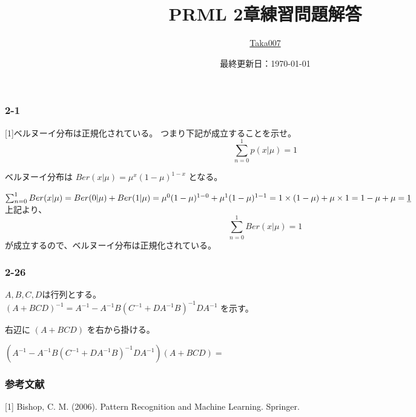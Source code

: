\documentclass{ltjsarticle}
\title{PRML 2章練習問題解答}
\author{\href{https://github.com/Taka0007}{Taka007}}
\date{最終更新日：\today}
\begin{document}
\maketitle

\subsubsection*{2-1}

[1]ベルヌーイ分布は正規化されている。
つまり下記が成立することを示せ。
$$
\sum_{n=0}^1 p(x| \mu ) = 1
$$

ベルヌーイ分布は
$
Ber(x| \mu) = \mu^x (1-\mu)^{1-x}
$
となる。

$
\sum_{n=0}^1 Ber(x| \mu)
= Ber(0| \mu) + Ber(1| \mu)
= \mu^0 (1-\mu)^{1-0} + \mu^1 (1-\mu)^{1-1}
= 1 \times (1-\mu) + \mu \times 1 \\
= 1-\mu + \mu
= \underline{1}
$
\\

上記より、
$$
\sum_{n=0}^1 Ber(x| \mu) = 1
$$
が成立するので、ベルヌーイ分布は正規化されている。






\subsubsection*{2-26}
$A,B,C,D$は行列とする。\\
$
(A + BCD)^{-1} 
=  A^{-1} -  A^{-1}B (C^{-1} + D A^{-1} B)^{-1} D A^{-1}
$
を示す。

右辺に
$
(A + BCD)
$
を右から掛ける。

$
(A^{-1} -  A^{-1}B (C^{-1} + D A^{-1} B)^{-1} D A^{-1}) (A + BCD)
= 
$












\subsubsection*{参考文献}

[1] Bishop, C. M. (2006). Pattern Recognition and Machine Learning. Springer.
\end{document}
